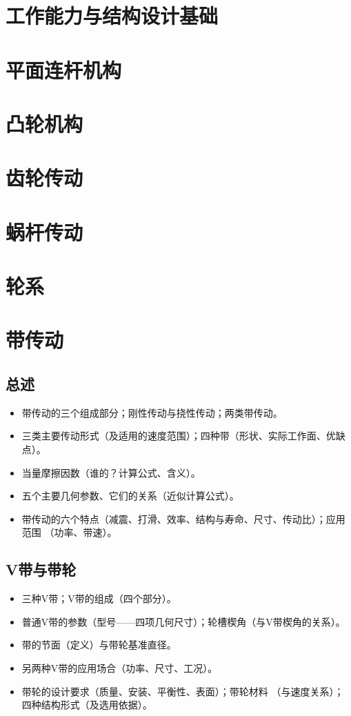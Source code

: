 \documentclass[12pt,a4paper]{article}
\newcommand{\tightlist}{\setlength{\parskip}{0pt}\setlength{\itemsep}{0pt}}
\newcommand{\hint}[1]{\textsf{（#1）}}
\newcommand{\minor}[1]{{\color{gray} #1}}
\begin{document}
\section{工作能力与结构设计基础}

\section{平面连杆机构}

\section{凸轮机构}

\section{齿轮传动}

\section{蜗杆传动}

\section{轮系}

\section{带传动}
\subsection{总述}
\begin{itemize}\tightlist
    \item 带传动的三个组成部分；刚性传动与挠性传动；两类带传动。
    \item 三类主要传动形式\hint{及适用的速度范围}；四种带\hint{形状、实际工作面、优缺点}。
    \item 当量摩擦因数\hint{谁的？计算公式、含义}。
    \item 五个主要几何参数、它们的关系\hint{近似计算公式}。
    \item 带传动的六个特点\hint{减震、打滑、效率、结构与寿命、尺寸、传动比}；应用范围
    \hint{功率、带速}。
\end{itemize}

\subsection{V带与带轮}
\begin{itemize}\tightlist
    \item 三种V带；V带的组成\hint{四个部分}。
    \item 普通V带的参数\hint{型号——四项几何尺寸}；轮槽楔角\hint{与V带楔角的关系}。
    \item 带的节面\hint{定义}与带轮基准直径。
    \item \minor{另两种V带的应用场合\hint{功率、尺寸、工况}。}
    \item \minor{带轮的设计要求\hint{质量、安装、平衡性、表面}；}带轮材料
    \hint{与速度关系}；\minor{四种结构形式\hint{及选用依据}。}
\end{itemize}
\end{document}
